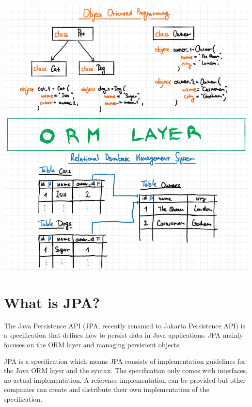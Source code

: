 \includegraphics[width=\textwidth]{./images/jpa/orm}


\section{What is JPA?}

The Java Persistence API (JPA; recently renamed to Jakarta Persistence API) is a specification that defines how to persist data in Java applications. JPA mainly focuses on the ORM layer and managing persistent objects.

JPA is a specification which means JPA consists of implementation guidelines for the Java ORM layer and the syntax. The specification only comes with interfaces, no actual implementation.  A reference implementation can be provided but other companies can create and distribute their own implementation of the specification.


